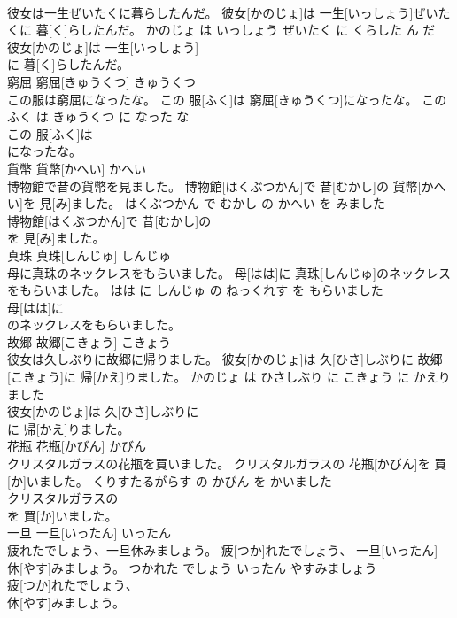 \documentclass[8pt]{extreport}
\begin{document}
\begin{CJK}{UTF8}{min}
\\	彼女は一生ぜいたくに暮らしたんだ。	彼女[かのじょ]は 一生[いっしょう]ぜいたくに 暮[く]らしたんだ。	かのじょ は いっしょう ぜいたく に くらした ん だ	
\\	彼女[かのじょ]は 一生[いっしょう]
\\	に 暮[く]らしたんだ。			
\\	窮屈	窮屈[きゅうくつ]	きゅうくつ	
\\	この服は窮屈になったな。	この 服[ふく]は 窮屈[きゅうくつ]になったな。	この ふく は きゅうくつ に なった な	
\\	この 服[ふく]は
\\	になったな。			
\\	貨幣	貨幣[かへい]	かへい	
\\	博物館で昔の貨幣を見ました。	博物館[はくぶつかん]で 昔[むかし]の 貨幣[かへい]を 見[み]ました。	はくぶつかん で むかし の かへい を みました	
\\	博物館[はくぶつかん]で 昔[むかし]の
\\	を 見[み]ました。			
\\	真珠	真珠[しんじゅ]	しんじゅ	
\\	母に真珠のネックレスをもらいました。	母[はは]に 真珠[しんじゅ]のネックレスをもらいました。	はは に しんじゅ の ねっくれす を もらいました	
\\	母[はは]に
\\	のネックレスをもらいました。			
\\	故郷	故郷[こきょう]	こきょう	
\\	彼女は久しぶりに故郷に帰りました。	彼女[かのじょ]は 久[ひさ]しぶりに 故郷[こきょう]に 帰[かえ]りました。	かのじょ は ひさしぶり に こきょう に かえりました	
\\	彼女[かのじょ]は 久[ひさ]しぶりに
\\	に 帰[かえ]りました。			
\\	花瓶	花瓶[かびん]	かびん	
\\	クリスタルガラスの花瓶を買いました。	クリスタルガラスの 花瓶[かびん]を 買[か]いました。	くりすたるがらす の かびん を かいました	
\\	クリスタルガラスの
\\	を 買[か]いました。			
\\	一旦	一旦[いったん]	いったん	
\\	疲れたでしょう、一旦休みましょう。	疲[つか]れたでしょう、 一旦[いったん] 休[やす]みましょう。	つかれた でしょう いったん やすみましょう	
\\	疲[つか]れたでしょう、
\\	休[やす]みましょう。			

\end{CJK}
\end{document}
